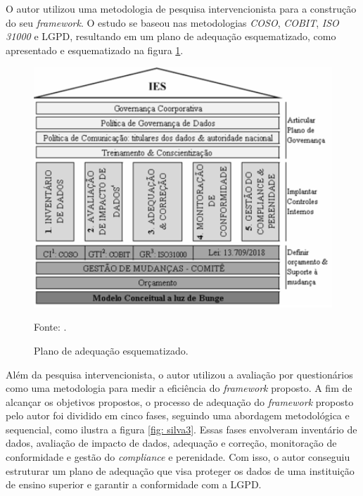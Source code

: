 \documentclass[
	12pt,				%
	openright,			%
	oneside,			%
	a4paper,			%
	english,			%
	french,				%
	spanish,			%
	brazil,				%
	]{abntex2}
\begin{document}
O autor utilizou uma metodologia de pesquisa intervencionista para a construção do seu \textit{framework}. O estudo se baseou nas metodologias \textit{COSO}, \textit{COBIT}, \textit{ISO 31000} e LGPD, resultando em um plano de adequação esquematizado, como apresentado e esquematizado na figura \ref{fig: silva2}.


\begin{figure}[ht]
    \centering
    \caption{Plano de adequação esquematizado.}
    \includegraphics[width=6.2in]{Images/13Silva2020.png}
    \label{fig: silva2}
    
    \centering \small Fonte: .
\end{figure}

Além da pesquisa intervencionista, o autor utilizou a avaliação por questionários como uma metodologia para medir a eficiência do \textit{framework} proposto. A fim de alcançar os objetivos propostos, o processo de adequação do \textit{framework} proposto pelo autor foi dividido em cinco fases, seguindo uma abordagem metodológica e sequencial, como ilustra a figura \ref{fig: silva3}. Essas fases envolveram inventário de dados, avaliação de impacto de dados, adequação e correção, monitoração de conformidade e gestão do \textit{compliance} e perenidade. Com isso, o autor conseguiu estruturar um plano de adequação que visa proteger os dados de uma instituição de ensino superior e garantir a conformidade com a LGPD.
\pagebreak
\end{document}
